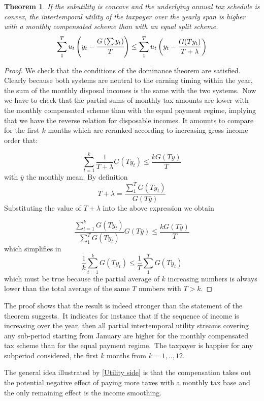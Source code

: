 \newtheorem{mydef}{Theorem} \begin {mydef}
If the subutility is concave and the underlying annual tax schedule is convex, the intertemporal utility of the taxpayer over the yearly span
is higher with a monthly compensated scheme than with an equal split scheme.
\begin {equation}
\sum _{1}^{T}{u_t\left (y_t-\cfrac {G\left (\sum {y_t}\right )}{T}\right )}\leq \sum _{1}^{T}{u_t\left (y_t-\frac{G(Ty_t)}{T+\lambda }\right )}
\end {equation}
\end {mydef}


\begin{proof}
We check that the conditions of the dominance theorem are satisfied. Clearly
because both systems are neutral to the earning timing within the year, the
sum of the monthly disposal incomes is the same with the two systems.\ Now we
have to check that the partial sums of monthly tax amounts are lower with the
monthly compensated scheme than with the equal payment regime, implying that
we have the reverse relation for disposable incomes. It amounts to compare for
the first $k$ months which are reranked according to increasing gross income
order that:


\[
\sum_{t=1}^{k}\frac{1}{T+\lambda}G(Ty_{t})\leq\frac{kG(T\bar{y})}{T}
\]
with $\bar{y}$ the monthly mean. By definition
\[
T+\lambda=\frac{\sum_{1}^{T}G(Ty_{t})}{G(T\bar{y})}
\]
Substituting the value of $T+\lambda$ into the above expression we obtain%

\[
\frac{\sum_{t=1}^{k}G(Ty_{t})}{\sum_{1}^{T}G(Ty_{t})}G(T\bar{y})\leq
\frac{kG(T\bar{y})}{T}
\]
which simplifies in
\[
\frac{1}{k}\sum_{t=1}^{k}G(Ty_{t})\leq\frac{1}{T}\sum_{1}^{T}G(Ty_{t})
\]
which must be true because the partial average of $k$ increasing numbers is
always lower than the total average of the same $T$ numbers with
$T>k.$\end{proof}%

The proof shows that the result is indeed stronger than the statement of the
theorem suggests.\ It indicates for instance that if the sequence of income is
increasing over the year, then all partial intertemporal utility streams
covering any sub-period starting from January are higher for the monthly
compensated tax scheme than for the equal payment regime.\ The taxpayer is
happier for any subperiod considered, the first $k$ months from $k=1,..,12.$

The general idea illustrated by \autoref{Utility side} is that the
compensation takes out the potential negative effect of paying more taxes with
a monthly tax base and the only remaining effect is the income smoothing.

